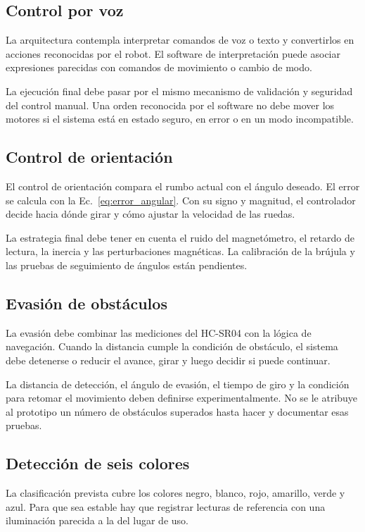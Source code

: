 \documentclass[journal]{IEEEtran}
\begin{document}
\subsection{Control por voz}

La arquitectura contempla interpretar comandos de voz o texto y convertirlos en acciones reconocidas por el robot. El software de interpretación puede asociar expresiones parecidas con comandos de movimiento o cambio de modo.

La ejecución final debe pasar por el mismo mecanismo de validación y seguridad del control manual. Una orden reconocida por el software no debe mover los motores si el sistema está en estado seguro, en error o en un modo incompatible.

\subsection{Control de orientación}

El control de orientación compara el rumbo actual con el ángulo deseado. El error se calcula con la Ec.~\ref{eq:error_angular}. Con su signo y magnitud, el controlador decide hacia dónde girar y cómo ajustar la velocidad de las ruedas.

La estrategia final debe tener en cuenta el ruido del magnetómetro, el retardo de lectura, la inercia y las perturbaciones magnéticas. La calibración de la brújula y las pruebas de seguimiento de ángulos están pendientes.

\subsection{Evasión de obstáculos}

La evasión debe combinar las mediciones del HC-SR04 con la lógica de navegación. Cuando la distancia cumple la condición de obstáculo, el sistema debe detenerse o reducir el avance, girar y luego decidir si puede continuar.

La distancia de detección, el ángulo de evasión, el tiempo de giro y la condición para retomar el movimiento deben definirse experimentalmente. No se le atribuye al prototipo un número de obstáculos superados hasta hacer y documentar esas pruebas.

\subsection{Detección de seis colores}

La clasificación prevista cubre los colores negro, blanco, rojo, amarillo, verde y azul. Para que sea estable hay que registrar lecturas de referencia con una iluminación parecida a la del lugar de uso.
\end{document}
